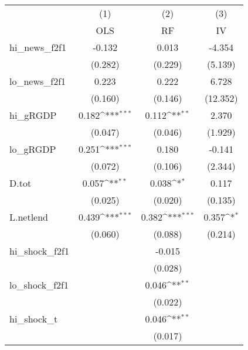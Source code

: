 {
\def\sym#1{\ifmmode^{#1}\else\(^{#1}\)\fi}
\begin{tabular}{l*{3}{c}}
\toprule
            &\multicolumn{1}{c}{(1)}&\multicolumn{1}{c}{(2)}&\multicolumn{1}{c}{(3)}\\
            &\multicolumn{1}{c}{OLS}&\multicolumn{1}{c}{RF}&\multicolumn{1}{c}{IV}\\
\midrule
hi\_news\_f2f1&      -0.132         &       0.013         &      -4.354         \\
            &     (0.282)         &     (0.229)         &     (5.139)         \\
\addlinespace
lo\_news\_f2f1&       0.223         &       0.222         &       6.728         \\
            &     (0.160)         &     (0.146)         &    (12.352)         \\
\addlinespace
hi\_gRGDP    &       0.182\sym{***}&       0.112\sym{**} &       2.370         \\
            &     (0.047)         &     (0.046)         &     (1.929)         \\
\addlinespace
lo\_gRGDP    &       0.251\sym{***}&       0.180         &      -0.141         \\
            &     (0.072)         &     (0.106)         &     (2.344)         \\
\addlinespace
D.tot       &       0.057\sym{**} &       0.038\sym{*}  &       0.117         \\
            &     (0.025)         &     (0.020)         &     (0.135)         \\
\addlinespace
L.netlend   &       0.439\sym{***}&       0.382\sym{***}&       0.357\sym{*}  \\
            &     (0.060)         &     (0.088)         &     (0.214)         \\
\addlinespace
hi\_shock\_f2f1&                     &      -0.015         &                     \\
            &                     &     (0.028)         &                     \\
\addlinespace
lo\_shock\_f2f1&                     &       0.046\sym{**} &                     \\
            &                     &     (0.022)         &                     \\
\addlinespace
hi\_shock\_t  &                     &       0.046\sym{**} &                     \\
            &                     &     (0.017)         &                     \\

\end{tabular}}
